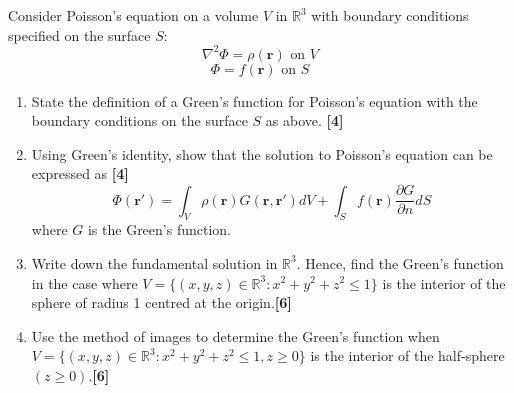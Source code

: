 \documentclass[a4paper]{article}
\begin{document}
\begin{qns}
Consider Poisson’s equation on a volume $V$ in $\mathbb{R}^3$ with boundary conditions specified on the surface $S$: 
$$\nabla^2\Phi=\rho(\mathbf{r})\text{ on  }V$$
$$\Phi=f(\mathbf{r})\text{ on }S$$
\begin{enumerate}[label=(\alph*)]
\item State the definition of a Green’s function for Poisson’s equation with the boundary conditions on the surface $S$ as above. \hfill\textbf{[4]}
\item Using Green’s identity, show that the solution to Poisson’s equation can be expressed as \hfill\textbf{[4]}
$$\Phi(\mathbf{r'})=\int_V\rho(\mathbf{r})G(\mathbf{r},\mathbf{r'})dV+\int_Sf(\mathbf{r})\frac{\partial G}{\partial n}dS$$
where $G$ is the Green’s function.
\item Write down the fundamental solution in $\mathbb{R}^3$. Hence, find the Green’s function in the case where $V = \{(x, y, z) \in\mathbb{R}^3: x^2 + y^2 + z^2\leq 1\}$ is the interior of the sphere of radius 1 centred at the origin.\hfill\textbf{[6]}
\item Use the method of images to determine the Green’s function when $V = \{(x, y, z)\in\mathbb{R}^3: x^2 + y^2 + z^2\leq 1, z \geq 0\}$ is the interior of the half-sphere $(z \geq 0)$.\hfill\textbf{[6]}
\end{enumerate}
\end{qns}
\newpage
\end{document}
